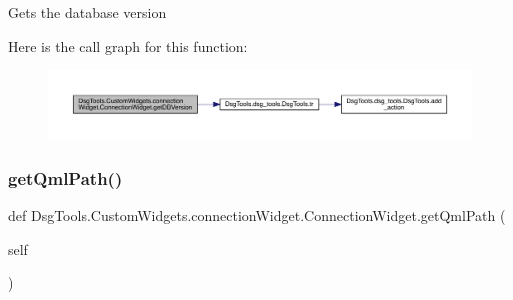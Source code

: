 \begin{DoxyVerb}Gets the database version
\end{DoxyVerb}
 Here is the call graph for this function\+:
\nopagebreak
\begin{figure}[H]
\begin{center}
\leavevmode
\includegraphics[width=350pt]{class_dsg_tools_1_1_custom_widgets_1_1connection_widget_1_1_connection_widget_a868be5c3d72e9f02fd128876ae6f4468_cgraph}
\end{center}
\end{figure}
\mbox{\label{class_dsg_tools_1_1_custom_widgets_1_1connection_widget_1_1_connection_widget_a265c92cef40ed91119a1b831141acb11}} 
\subsubsection{\texorpdfstring{get\+Qml\+Path()}{getQmlPath()}}
{\footnotesize\ttfamily def Dsg\+Tools.\+Custom\+Widgets.\+connection\+Widget.\+Connection\+Widget.\+get\+Qml\+Path (\begin{DoxyParamCaption}\item[{}]{self }\end{DoxyParamCaption})}

